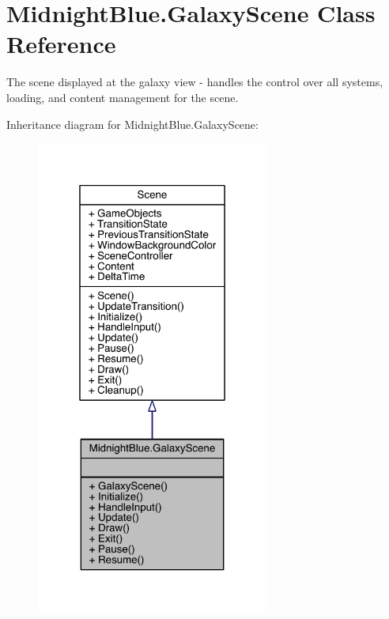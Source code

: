 \hypertarget{class_midnight_blue_1_1_galaxy_scene}{}\section{Midnight\+Blue.\+Galaxy\+Scene Class Reference}
\label{class_midnight_blue_1_1_galaxy_scene}


The scene displayed at the galaxy view -\/ handles the control over all systems, loading, and content management for the scene.  




Inheritance diagram for Midnight\+Blue.\+Galaxy\+Scene\+:
\nopagebreak
\begin{figure}[H]
\begin{center}
\leavevmode
\includegraphics[width=217pt]{class_midnight_blue_1_1_galaxy_scene__inherit__graph}
\end{center}
\end{figure}


